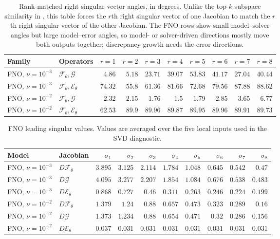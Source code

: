\begin{table}[H]
\centering
\footnotesize
\caption{Rank-matched right singular vector angles, in degrees. Unlike the
top-$k$ subspace similarity in , this
table forces the $r$th right singular vector of one Jacobian to match the $r$th
right singular vector of the other Jacobian. The FNO rows show small
model--solver angles but large model--error angles, so model- or solver-driven
directions mostly move both outputs together; discrepancy growth needs the
error directions.}
\label{tab:local-svd-rank-angles}
\setlength{\tabcolsep}{3pt}
\begin{tabular}{llrrrrrrrr}
\toprule
Family & Operators & $r=1$ & $r=2$ & $r=3$ & $r=4$ & $r=5$ & $r=6$ & $r=7$ & $r=8$ \\
\midrule
FNO, $\nu=10^{-3}$ & $\mathcal{F}_\theta,\mathcal{G}$ & $4.86$ & $5.18$ & $23.71$ & $39.07$ & $53.83$ & $41.17$ & $27.04$ & $40.44$ \\
FNO, $\nu=10^{-3}$ & $\mathcal{F}_\theta,\mathcal{E}_\theta$ & $74.32$ & $55.8$ & $61.36$ & $81.66$ & $72.68$ & $79.56$ & $87.88$ & $88.62$ \\
FNO, $\nu=10^{-2}$ & $\mathcal{F}_\theta,\mathcal{G}$ & $2.32$ & $2.15$ & $1.76$ & $1.5$ & $1.79$ & $2.85$ & $3.65$ & $6.77$ \\
FNO, $\nu=10^{-2}$ & $\mathcal{F}_\theta,\mathcal{E}_\theta$ & $62.53$ & $89.9$ & $89.96$ & $89.87$ & $89.95$ & $89.96$ & $89.91$ & $89.73$ \\
\bottomrule
\end{tabular}
\end{table}

\begin{table}[H]
\centering
\footnotesize
\caption{FNO leading singular values. Values are averaged over the five local
inputs used in the SVD diagnostic.}
\label{tab:local-svd-singular-values}
\setlength{\tabcolsep}{3pt}
\begin{tabular*}{\textwidth}{@{\extracolsep{\fill}}llrrrrrrrr@{}}
\toprule
Model & Jacobian & $\sigma_1$ & $\sigma_2$ & $\sigma_3$ & $\sigma_4$ & $\sigma_5$ & $\sigma_6$ & $\sigma_7$ & $\sigma_8$ \\
\midrule
FNO, $\nu=10^{-3}$ & $D\mathcal{F}_\theta$ & $3.895$ & $3.125$ & $2.114$ & $1.784$ & $1.048$ & $0.645$ & $0.542$ & $0.47$ \\
FNO, $\nu=10^{-3}$ & $D\mathcal{G}$ & $4.095$ & $3.277$ & $2.207$ & $1.854$ & $1.084$ & $0.676$ & $0.538$ & $0.483$ \\
FNO, $\nu=10^{-3}$ & $D\mathcal{E}_\theta$ & $0.868$ & $0.727$ & $0.46$ & $0.311$ & $0.263$ & $0.246$ & $0.224$ & $0.199$ \\
FNO, $\nu=10^{-2}$ & $D\mathcal{F}_\theta$ & $1.379$ & $1.24$ & $0.88$ & $0.657$ & $0.473$ & $0.323$ & $0.289$ & $0.16$ \\
FNO, $\nu=10^{-2}$ & $D\mathcal{G}$ & $1.373$ & $1.234$ & $0.88$ & $0.654$ & $0.471$ & $0.32$ & $0.286$ & $0.156$ \\
FNO, $\nu=10^{-2}$ & $D\mathcal{E}_\theta$ & $0.037$ & $0.031$ & $0.031$ & $0.031$ & $0.031$ & $0.031$ & $0.031$ & $0.031$ \\
\bottomrule
\end{tabular*}
\end{table}

